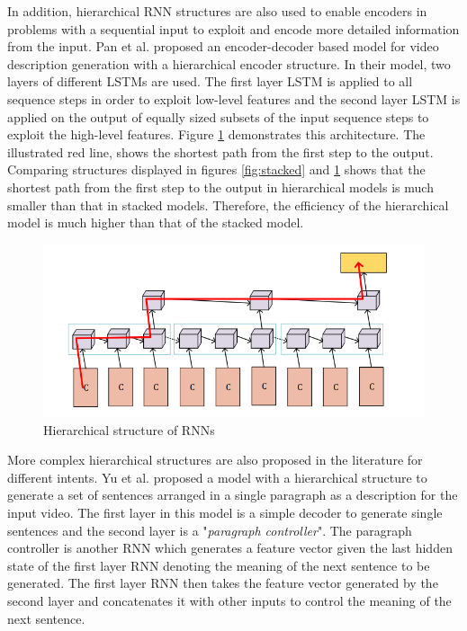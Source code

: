 \documentclass[preprint, 10pt]{elsarticle}
\begin{document}
		In addition, hierarchical RNN structures are also used to enable encoders in problems with a sequential input to exploit and encode more detailed information from the input. Pan et al. \cite{pan2016hierarchical} proposed an encoder-decoder based model for video description generation with a hierarchical encoder structure. In their model, two layers of different LSTMs are used. The first layer LSTM is applied to all sequence steps in order to exploit low-level features and the second layer LSTM is applied on the output of equally sized subsets of the input sequence steps to exploit the high-level features. Figure \ref{fig:hrne} demonstrates this architecture. The illustrated red line, shows the shortest path from the first step to the output. Comparing structures displayed in figures \ref{fig:stacked} and \ref{fig:hrne} shows that the shortest path from the first step to the output in hierarchical models is much smaller than that in stacked models. Therefore, the efficiency of the hierarchical model is much higher than that of the stacked model.
				\begin{figure}[h]
			\centering
			\includegraphics[scale=0.4]{Imgs/hrne.png}
			\caption{Hierarchical structure of RNNs \cite{pan2016hierarchical}}
			\label{fig:hrne}
		\end{figure}
		More complex hierarchical structures are also proposed in the literature for different intents. Yu et al.\cite{yu2016video} proposed a model with a hierarchical structure to generate a set of sentences arranged in a single paragraph as a description for the input video. The first layer in this model is a simple decoder to generate single sentences and the second layer is a "\textit{paragraph controller}". The paragraph controller is another RNN which generates a feature vector given the last hidden state of the first layer RNN denoting the meaning of the next sentence to be generated. The first layer RNN then takes the feature vector generated by the second layer and concatenates it with other inputs to control the meaning of the next sentence.
				
\end{document}
